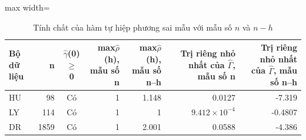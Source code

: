 \begin{table}[H]
\centering\footnotesize
\caption{Tính chất của hàm tự hiệp phương sai mẫu với mẫu số $n$ và $n-h$}\label{tab:tab_b11_02_gamma_properties}
\begin{adjustbox}{max width=\linewidth}
\begin{tabular}{|l|r|c|r|r|r|r|}
\toprule
Bộ dữ liệu & n & $\hat{\gamma}$(0) $\ge$ 0 & max\textbar{}$\hat{\rho}$(h)\textbar{}, mẫu số n & max\textbar{}$\hat{\rho}$(h)\textbar{}, mẫu số n–h & Trị riêng nhỏ nhất của $\hat{\Gamma}$, mẫu số n & Trị riêng nhỏ nhất của $\hat{\Gamma}$, mẫu số n–h \\
\midrule
HU & 98 & Có & 1 & 1.148 & 0.0127 & -7.319 \\
LY & 114 & Có & 1 & 1 & $9.412\times10^{-4}$ & -0.4807 \\
DR & 1859 & Có & 1 & 2.001 & 0.0588 & -4.386 \\
\bottomrule
\end{tabular}
\end{adjustbox}\par{}
\end{table}
